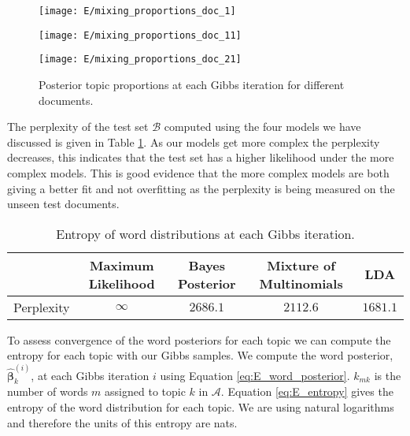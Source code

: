 \documentclass[11pt]{article}
\begin{document}
\begin{figure}
    \centering
    \begin{minipage}{0.32\textwidth}
        \centering
        \texttt{[image: E/mixing\_proportions\_doc\_1]}
        \label{fig:E_topics_0}
    \end{minipage}
    \begin{minipage}{0.32\textwidth}
        \centering
        \texttt{[image: E/mixing\_proportions\_doc\_11]}
        \label{fig:E_topics_1}
    \end{minipage}
    \begin{minipage}{0.32\textwidth}
        \centering
        \texttt{[image: E/mixing\_proportions\_doc\_21]}
        \label{fig:E_topics_2}
    \end{minipage}
    \caption{Posterior topic proportions at each Gibbs iteration for different documents.}
    \label{fig:E_topic_proportions}
\end{figure}

The perplexity of the test set $\mathcal{B}$ computed using the four models we have discussed is given in Table \ref{tab:E_perplexity}. As our models get more complex the perplexity decreases, this indicates that the test set has a higher likelihood under the more complex models. This is good evidence that the more complex models are both giving a better fit and not overfitting as the perplexity is being measured on the unseen test documents.

\begin{table}
    \centering
    \small
    \begin{tabular}{|c|cccc|}
        \hline
         & Maximum Likelihood & Bayes Posterior & Mixture of Multinomials & LDA \\
        \hline
        Perplexity & $\infty$ & $2686.1$ & $2112.6$ & $1681.1$\\
        \hline
    \end{tabular}
    \caption{Entropy of word distributions at each Gibbs iteration.}
    \label{tab:E_perplexity}
\end{table}

To assess convergence of the word posteriors for each topic we can compute the entropy for each topic with our Gibbs samples. We compute the word posterior, $\boldsymbol{\hat \beta}_k^{(i)}$, at each Gibbs iteration $i$ using Equation \ref{eq:E_word_posterior}. $k_{mk}$ is the number of words $m$ assigned to topic $k$ in $\mathcal{A}$. Equation \ref{eq:E_entropy} gives the entropy of the word distribution for each topic. We are using natural logarithms and therefore the units of this entropy are nats.
\end{document}
